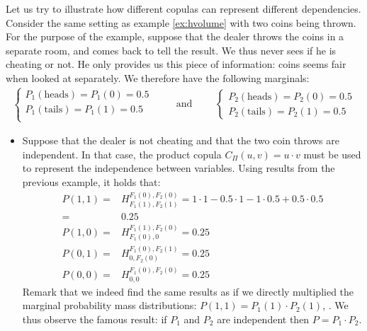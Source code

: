 \begin{example}\label{ex:copulas}
    Let us try to illustrate how different copulas can represent different dependencies. 
    Consider the same setting as example \ref{ex:hvolume} with two coins being thrown. For the purpose of the example, suppose that the dealer throws the coins in a separate room, and comes back to tell the result. We thus never sees if he is cheating or not. He only provides us this piece of information: coins seems fair when looked at separately. We therefore have the following marginals:
    \begin{eqnarray*}
    \begin{cases}
        P_1(\text{heads}) = P_1(0) = 0.5\\
        P_1(\text{tails}) = P_1(1) = 0.5\\
    \end{cases}
    \qquad\text{ and }\qquad
    \begin{cases}
        P_2(\text{heads}) = P_2(0) = 0.5\\
        P_2(\text{tails}) = P_2(1) = 0.5
    \end{cases}
    \end{eqnarray*}
    
    \begin{itemize}
        \item Suppose that the dealer is not cheating and that the two coin throws are independent. In that case, the product copula $C_\Pi(u,v)=u\cdot v$ must be used to represent the independence between variables.
        Using results from the previous example, it holds that:
        \begin{align*}
            P(1,1) =& H_{F_1(1), F_2(1)}^{F_1(0), F_2(0)} = 1\cdot1 - 0.5\cdot1 - 1\cdot0.5 + 0.5\cdot0.5\\
            =& 0.25\\
            P(1,0) =& H_{F_1(0), 0}^{F_1(1), F_2(0)} = 0.25 \\
            P(0,1) =& H_{0, F_2(0)}^{F_1(0), F_2(1)} = 0.25 \\
            P(0,0) =& H_{0, 0}^{F_1(0), F_2(0)} = 0.25
        \end{align*}
        Remark that we indeed find the same results as if we directly multiplied the marginal probability mass distributions: $P(1,1) = P_1(1)\cdot P_2(1)$, \etc. We thus observe the famous result: if $P_1$ and $P_2$ are independent then $P=P_1\cdot P_2$.
        

\end{itemize}
\end{example}

